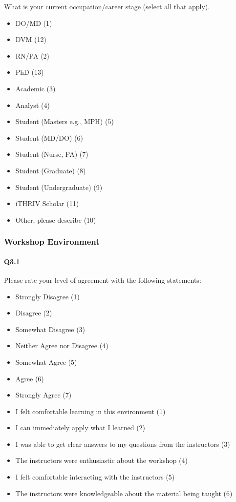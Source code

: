 \documentclass[030-workshop.tex]{subfiles}
\begin{document}
    What is your current occupation/career stage (select all that apply).

    \begin{itemize}
        \item DO/MD  (1)
        \item DVM  (12)
        \item RN/PA  (2)
        \item PhD  (13)
        \item Academic  (3)
        \item Analyst  (4)
        \item Student (Masters e.g., MPH)  (5)
        \item Student (MD/DO)  (6)
        \item Student (Nurse, PA)  (7)
        \item Student (Graduate)  (8)
        \item Student (Undergraduate)  (9)
        \item iTHRIV Scholar  (11)
        \item Other, please describe  (10)
    \end{itemize}

\subsubsection{Workshop Environment}

    \paragraph{Q3.1}

        Please rate your level of agreement with the following statements:

        \begin{itemize}
            \item Strongly Disagree (1)
            \item Disagree (2)
            \item Somewhat Disagree (3)
            \item Neither Agree nor Disagree (4)
            \item Somewhat Agree (5)
            \item Agree (6)
            \item Strongly Agree (7)
        \end{itemize}

        \begin{itemize}
            \item I felt comfortable learning in this environment (1)
            \item I can immediately apply what I learned (2)
            \item I was able to get clear answers to my questions from the instructors (3)
            \item The instructors were enthusiastic about the workshop (4)
            \item I felt comfortable interacting with the instructors (5)
            \item The instructors were knowledgeable about the material being taught (6)
        \end{itemize}
\end{document}
